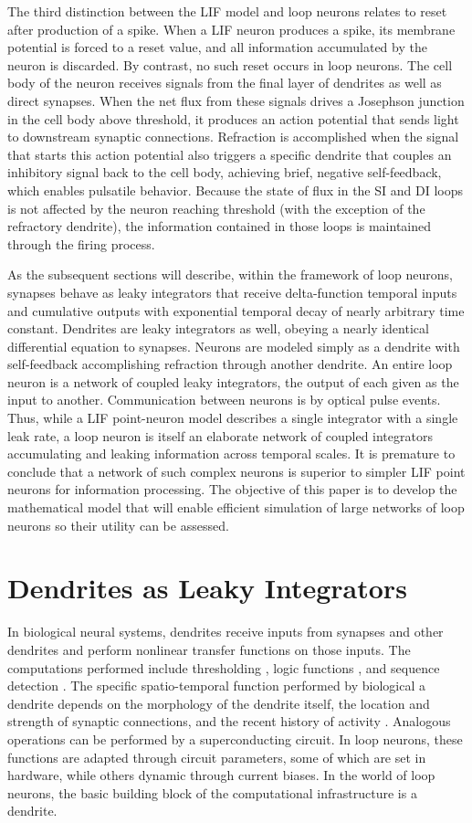 \documentclass[twocolumn]{article}
\begin{document}
The third distinction between the LIF model and loop neurons relates to reset after production of a spike. When a LIF neuron produces a spike, its membrane potential is forced to a reset value, and all information accumulated by the neuron is discarded. By contrast, no such reset occurs in loop neurons. The cell body of the neuron receives signals from the final layer of dendrites as well as direct synapses. When the net flux from these signals drives a Josephson junction in the cell body above threshold, it produces an action potential that sends light to downstream synaptic connections. Refraction is accomplished when the signal that starts this action potential also triggers a specific dendrite that couples an inhibitory signal back to the cell body, achieving brief, negative self-feedback, which enables pulsatile behavior. Because the state of flux in the SI and DI loops is not affected by the neuron reaching threshold (with the exception of the refractory dendrite), the information contained in those loops is maintained through the firing process. 

As the subsequent sections will describe, within the framework of loop neurons, synapses behave as leaky integrators that receive delta-function temporal inputs and cumulative outputs with exponential temporal decay of nearly arbitrary time constant. Dendrites are leaky integrators as well, obeying a nearly identical differential equation to synapses. Neurons are modeled simply as a dendrite with self-feedback accomplishing refraction through another dendrite. An entire loop neuron is a network of coupled leaky integrators, the output of each given as the input to another. Communication between neurons is by optical pulse events. Thus, while a LIF point-neuron model describes a single integrator with a single leak rate, a loop neuron is itself an elaborate network of coupled integrators accumulating and leaking information across temporal scales. It is premature to conclude that a network of such complex neurons is superior to simpler LIF point neurons for information processing. The objective of this paper is to develop the mathematical model that will enable efficient simulation of large networks of loop neurons so their utility can be assessed.

\section{\label{sec:dendrites}Dendrites as Leaky Integrators}
In biological neural systems, dendrites receive inputs from synapses and other dendrites and perform nonlinear transfer functions on those inputs. The computations performed include thresholding \cite{}, logic functions \cite{}, and sequence detection \cite{}. The specific spatio-temporal function performed by biological a dendrite depends on the morphology of the dendrite itself, the location and strength of synaptic connections, and the recent history of activity \cite{}. Analogous operations can be performed by a superconducting circuit. In loop neurons, these functions are adapted through circuit parameters, some of which are set in hardware, while others dynamic through current biases. In the world of loop neurons, the basic building block of the computational infrastructure is a dendrite.
\end{document}

